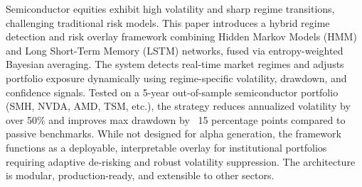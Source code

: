 Semiconductor equities exhibit high volatility and sharp regime transitions, challenging traditional risk models.
This paper introduces a hybrid regime detection and risk overlay framework combining Hidden Markov Models (HMM) and Long Short-Term Memory (LSTM) networks, fused via entropy-weighted Bayesian averaging.
The system detects real-time market regimes and adjusts portfolio exposure dynamically using regime-specific volatility, drawdown, and confidence signals.
Tested on a 5-year out-of-sample semiconductor portfolio (SMH, NVDA, AMD, TSM, etc.), the strategy reduces annualized volatility by over 50\% and improves max drawdown by ~15 percentage points compared to passive benchmarks.
While not designed for alpha generation, the framework functions as a deployable, interpretable overlay for institutional portfolios requiring adaptive de-risking and robust volatility suppression.
The architecture is modular, production-ready, and extensible to other sectors.

